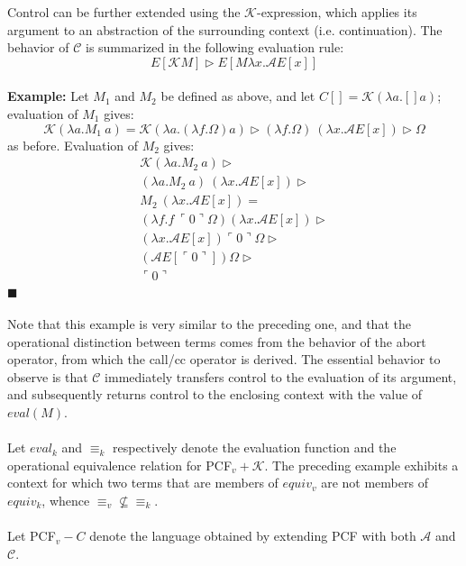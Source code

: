 \documentclass[a4paper,10pt]{article}
\begin{document}
Control can be further extended using the $\mathcal{K}$-expression, which applies its argument
to an abstraction of the surrounding context (i.e. continuation).  The behavior of $\mathcal{C}$ is
summarized in the following evaluation rule:\\
\[
 E[\mathcal{K} M] \rhd E[M \lambda x . \mathcal{A} E[x]]
\]
\\
\textbf{Example:} Let $M_1$ and $M_2$ be defined as above, and let $C[] = \mathcal{K} (\lambda a . []a)$;
evaluation of $M_1$ gives:\\
\[
 \mathcal{K}(\lambda a . M_1\ a) = \mathcal{K} (\lambda a . (\lambda f . \Omega) a) \rhd
(\lambda f . \Omega)\ (\lambda x . \mathcal{A} E[x]) \rhd \Omega
\]
as before.  Evaluation of $M_2$ gives:\\
\begin{eqnarray*}
 \mathcal{K}(\lambda a . M_2\ a) \rhd\\
(\lambda a . M_2\ a)\ (\lambda x . \mathcal{A} E[x]) \rhd\\
M_2\ (\lambda x . \mathcal{A} E[x]) =\\
(\lambda f . f\ \ulcorner 0 \urcorner \Omega) (\lambda x . \mathcal{A} E[x]) \rhd\\
(\lambda x . \mathcal{A} E[x]) \ulcorner 0 \urcorner \Omega \rhd\\
(\mathcal{A} E[\ulcorner 0 \urcorner]) \Omega \rhd\\
 \ulcorner 0 \urcorner\\
\end{eqnarray*}
$\blacksquare$\\
\\

Note that this example is very similar to the preceding one, and that the operational distinction
between terms comes from the behavior of the abort operator, from which the call/cc operator is
derived.  The essential behavior to observe is that $\mathcal{C}$ immediately transfers control
to the evaluation of its argument, and subsequently returns control to the enclosing context with
the value of $eval(M)$.\\
\\
Let $eval_k$ and $\equiv_k$ respectively denote the evaluation function and the operational equivalence
relation for PCF$_v+\mathcal{K}$.  The preceding example exhibits a context for which two terms
that are members of $equiv_v$ are not members of $equiv_k$, whence $\equiv_v \nsubseteq \equiv_k$.\\
\\
Let PCF$_v-C$ denote the language obtained by extending PCF with both $\mathcal{A}$ and $\mathcal{C}$.
\end{document}
